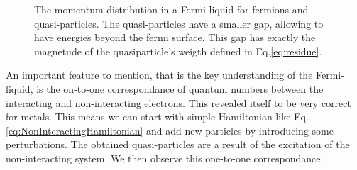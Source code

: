 \documentclass[../main.tex]{subfile}
\begin{document}
\begin{figure}[H]\centering

        \caption{The momentum distribution in a Fermi liquid for fermions and quasi-particles. The quasi-particles have a smaller gap, allowing to have energies beyond the 
        fermi surface. This gap has exactly the magnetude of the quasiparticle's weigth defined in Eq.\ref{eq:residue}.}
    \end{figure}

An important feature to mention, that is the key understanding of the Fermi-liquid, is the on-to-one correspondance of quantum numbers between the interacting and non-interacting electrons. 
This revealed itself to be very correct 
for metals.
This means we can start with simple Hamiltonian like Eq.\ref{eq:NonInteractingHamiltonian} and add new particles by introducing
some perturbations. The obtained quasi-particles are a result of the excitation of the non-interacting system. We then observe this
one-to-one correspondance.\\
\end{document}
